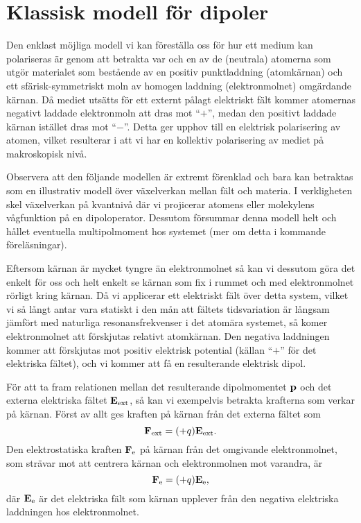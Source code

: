 \section{Klassisk modell f{\"o}r dipoler}
Den enklast m{\"o}jliga modell vi kan f{\"o}rest{\"a}lla oss f{\"o}r hur ett
medium kan polariseras {\"a}r genom att betrakta var och en av de (neutrala)
atomerna som utg{\"o}r materialet som best{\aa}ende av en positiv punktladdning
(atomk{\"a}rnan) och ett sf{\"a}risk-symmetriskt moln av homogen laddning
(elektronmolnet) omg{\"a}rdande k{\"a}rnan. D{\aa} mediet uts{\"a}tts f{\"o}r
ett externt p{\aa}lagt elektriskt f{\"a}lt kommer atomernas negativt laddade
elektronmoln att dras mot ``$+$'', medan den positivt laddade k{\"a}rnan
ist{\"a}llet dras mot ``$-$''. Detta ger upphov till en elektrisk polarisering
av atomen, vilket resulterar i att vi har en kollektiv polarisering av mediet
p{\aa} makroskopisk niv{\aa}.

Observera att den f{\"o}ljande modellen {\"a}r extremt f{\"o}renklad och bara
kan betraktas som en illustrativ modell {\"o}ver v{\"a}xelverkan mellan
f{\"a}lt och materia. I verkligheten skel v{\"a}xelverkan p{\aa} kvantniv{\aa}
d{\"a}r vi projicerar atomens eller molekylens v{\aa}gfunktion p{\aa} en
dipoloperator. Dessutom f{\"o}rsummar denna modell helt och h{\aa}llet
eventuella multipolmoment hos systemet (mer om detta i kommande
f{\"o}rel{\"a}sningar).
\bigskip
\centerline{}
\medskip
\noindent
Eftersom k{\"a}rnan {\"a}r mycket tyngre {\"a}n elektronmolnet s{\aa} kan vi
dessutom g{\"o}ra det enkelt f{\"o}r oss och helt enkelt se k{\"a}rnan som fix
i rummet och med elektronmolnet r{\"o}rligt kring k{\"a}rnan.
D{\aa} vi applicerar ett elektriskt f{\"a}lt {\"o}ver detta system, vilket vi
s{\aa} l{\aa}ngt antar vara statiskt i den m{\aa}n att f{\"a}ltets
tidsvariation {\"a}r l{\aa}ngsam j{\"a}mf{\"o}rt med naturliga
resonansfrekvenser i det atom{\"a}ra systemet, s{\aa} komer elektronmolnet att
f{\"o}rskjutas relativt atomk{\"a}rnan. Den negativa laddningen kommer att
f{\"o}rskjutas mot positiv elektrisk potential (k{\"a}llan ``$+$'' f{\"o}r
det elektriska f{\"a}ltet), och vi kommer att f{\aa} en resulterande elektrisk
dipol.
\vfill\eject

\bigskip
\centerline{}
\medskip
\noindent
F{\"o}r att ta fram relationen mellan det resulterande dipolmomentet ${\bf p}$
och det externa elektriska f{\"a}ltet ${\bf E}_{\rm ext}$, s{\aa} kan vi
exempelvis betrakta krafterna som verkar p{\aa} k{\"a}rnan. F{\"o}rst av
allt ges kraften p{\aa} k{\"a}rnan fr{\aa}n det externa f{\"a}ltet som
$$
  {\bf F}_{\rm ext}=(+q){\bf E}_{\rm ext}.
$$
Den elektrostatiska kraften ${\bf F}_{\rm e}$ p{\aa} k{\"a}rnan fr{\aa}n det
omgivande elektronmolnet, som str{\"a}var mot att centrera k{\"a}rnan och
elektronmolnen mot varandra, {\"a}r
$$
  {\bf F}_{\rm e}=(+q){\bf E}_{\rm e},
$$
d{\"a}r ${\bf E}_{\rm e}$ {\"a}r det elektriska f{\"a}lt som k{\"a}rnan upplever
fr{\aa}n den negativa elektriska laddningen hos elektronmolnet.

